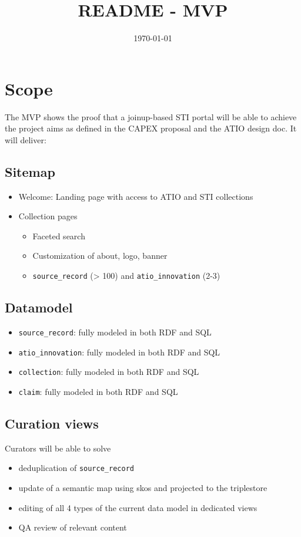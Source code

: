 \documentclass{scrartcl}
\date{\today}
\title{README - MVP}
\begin{document}
\maketitle
\tableofcontents

\section{Scope}
\label{sec:org81fe309}
The MVP shows the proof that a joinup-based STI portal will be able to achieve the project aims as defined in the CAPEX proposal and the ATIO design doc.
It will deliver:
\subsection{Sitemap}
\label{sec:org034737e}
\begin{itemize}
\item Welcome: Landing page with access to ATIO and STI collections
\item Collection pages
\begin{itemize}
\item Faceted search
\item Customization of about, logo, banner
\item \texttt{source\_record} (> 100) and \texttt{atio\_innovation} (2-3)
\end{itemize}
\end{itemize}
\subsection{Datamodel}
\label{sec:org3932fd8}
\begin{itemize}
\item \texttt{source\_record}: fully modeled in both RDF and SQL
\item \texttt{atio\_innovation}: fully modeled in both RDF and SQL
\item \texttt{collection}: fully modeled in both RDF and SQL
\item \texttt{claim}: fully modeled in both RDF and SQL
\end{itemize}
\subsection{Curation views}
\label{sec:orgd0fa9e9}
Curators will be able to solve
\begin{itemize}
\item deduplication of \texttt{source\_record}
\item update of a semantic map using skos and projected to the triplestore
\item editing of all 4 types of the current data model in dedicated views
\item QA review of relevant content
\end{itemize}
\end{document}
